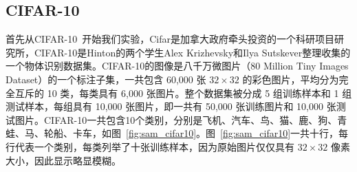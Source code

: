 \subsection{CIFAR-10}
\label{sec:sap:experiment:cifar10}

首先从CIFAR-10~\cite{krizhevsky2009learning}开始我们实验，Cifar是加拿大政府牵头投资的一个科研项目研究所，CIFAR-10是Hinton的两个学生Alex Krizhevsky和Ilya Sutskever整理收集的一个物体识别数据集。CIFAR-10的图像是八千万微图片（80 Million Tiny Images Dataset）的一个标注子集，一共包含 60,000 张 $32\times32$ 的彩色图片，平均分为完全互斥的 10 类，每类具有 6,000 张图片。整个数据集被分成 5 组训练样本和 1 组测试样本，每组具有 10,000 张图片，即一共有 50,000 张训练图片和 10,000 张测试图片。CIFAR-10一共包含10个类别，分别是飞机、汽车、鸟、猫、鹿、狗、青蛙、马、轮船、卡车，如图~\ref{fig:sam_cifar10}。图~\ref{fig:sam_cifar10}一共十行，每行代表一个类别，每类列举了十张训练样本，因为原始图片仅仅具有 $32\times32$ 像素大小，因此显示略显模糊。

